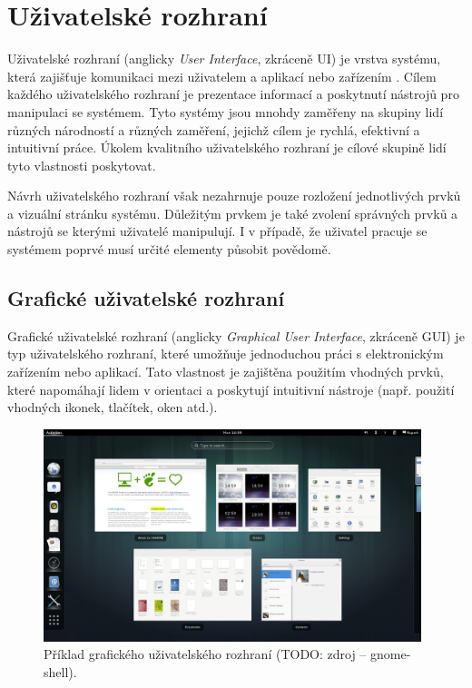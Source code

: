 \chapter{Uživatelské rozhraní}
\label{chap:ui}

Uživatelské rozhraní (anglicky \textit{User Interface}, zkráceně UI) je vrstva systému, která zajišťuje komunikaci mezi uživatelem a aplikací nebo zařízením \cite{smashing-ui}. Cílem každého uživatelského rozhraní je prezentace informací a poskytnutí nástrojů pro manipulaci se systémem. Tyto systémy jsou mnohdy zaměřeny na skupiny lidí různých národností a různých zaměření, jejichž cílem je rychlá, efektivní a intuitivní práce. Úkolem kvalitního uživatelského rozhraní je cílové skupině lidí tyto vlastnosti poskytovat.

Návrh uživatelského rozhraní však nezahrnuje pouze rozložení jednotlivých prvků a vizuální stránku systému. Důležitým prvkem je také zvolení správných prvků a nástrojů se kterými uživatelé manipulují. I v případě, že uživatel pracuje se systémem poprvé musí určité elementy působit povědomě.

\section{Grafické uživatelské rozhraní}
\label{sec:gui}

Grafické uživatelské rozhraní (anglicky \textit{Graphical User Interface}, zkráceně GUI) je typ uživatelského rozhraní, které umožňuje jednoduchou práci s elektronickým zařízením nebo aplikací. Tato vlastnost je zajištěna použitím vhodných prvků, které napomáhají lidem v orientaci a poskytují intuitivní nástroje (např. použití vhodných ikonek, tlačítek, oken atd.).

\begin{figure}[htbp]
    \centering
    \includegraphics[width=11cm]{images/gui-example.png}
    \caption{Příklad grafického uživatelského rozhraní (TODO: zdroj -- gnome-shell).}
\end{figure}

